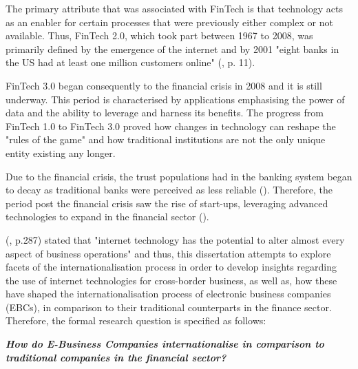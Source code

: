 \documentclass[11pt,a4paper]{article}
\begin{document}
The primary attribute that was associated with FinTech is that technology acts as an enabler for certain processes that were previously either complex or not available. Thus, FinTech 2.0, which took part between 1967 to 2008, was primarily defined by the emergence of the internet and by 2001 "eight banks in the US had at least one million customers online"  (\cite{buckleyEvolutionFintechNew2016}, p. 11). \par 
FinTech 3.0 began consequently to the financial crisis in 2008 and it is still underway. This period is characterised by applications emphasising the power of data and the ability to leverage and harness its benefits. The progress from FinTech 1.0 to FinTech 3.0 proved how changes in technology can reshape the "rules of the game" and how traditional institutions are not the only unique entity existing any longer. \par
Due to the financial crisis, the trust populations had in the banking system began to decay as traditional banks were perceived as less reliable (\cite{andrewConfidenceBanksLow2015}). Therefore, the period post the financial crisis saw the rise of start-ups, leveraging advanced technologies to expand in the financial sector (\cite{arner150YearsFintech2016}).  \par
\citeauthor{parasuramanMarketingServingCustomers2002} (\citeyear{parasuramanMarketingServingCustomers2002}, p.287) stated that "internet technology has the potential to alter almost every aspect of business operations"  and thus, this dissertation attempts to explore facets of the internationalisation process in order to  develop insights regarding the use of internet technologies for cross-border business, as well as, how these have shaped the internationalisation process of electronic business companies (EBCs), in comparison to their traditional counterparts in the finance sector.  Therefore, the formal research question is specified as follows:

\begin{center}
\textbf{\textit{How do E-Business Companies internationalise in comparison to traditional companies in the financial sector?}}
\end{center}
 

\newpage




\end{document}
